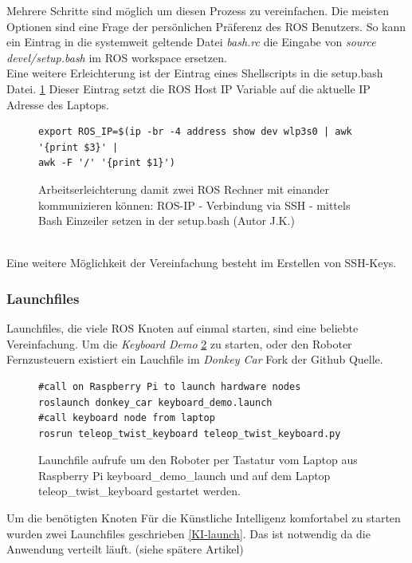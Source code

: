 \documentclass[conference]{IEEEtran}
\begin{document}
	Mehrere Schritte sind möglich um diesen Prozess zu vereinfachen. Die 
	meisten Optionen sind eine Frage der persönlichen Präferenz des ROS 
	Benutzers. So kann ein Eintrag in die systemweit geltende Datei 
	\textit{bash.rc} die Eingabe von \textit{source devel/setup.bash} im ROS 
	workspace ersetzen. \\
	Eine weitere Erleichterung ist der Eintrag eines Shellscripts in die 
	setup.bash Datei. \ref{Einzeiler} Dieser Eintrag setzt die ROS Host IP 
	Variable auf die aktuelle IP Adresse des Laptops.
	\begin{figure}
		\centering
\begin{verbatim}
export ROS_IP=$(ip -br -4 address show dev wlp3s0 | awk '{print $3}' | 
awk -F '/' '{print $1}')
\end{verbatim}
		\label{Einzeiler}
		\caption{Arbeitserleichterung damit zwei ROS Rechner mit einander 
		kommunizieren können: ROS-IP - Verbindung via SSH - mittels Bash 
		Einzeiler setzen  in der setup.bash (Autor J.K.)}
	\end{figure}
	\\
	Eine weitere Möglichkeit der Vereinfachung besteht im Erstellen von 
	SSH-Keys. 
	
	\subsubsection{Launchfiles}
	
	Launchfiles, die viele ROS Knoten auf einmal starten, sind eine beliebte 
	Vereinfachung. Um die \textit{Keyboard Demo} \ref{demo} zu starten, oder 
	den Roboter Fernzusteuern existiert ein Lauchfile im \textit{Donkey Car} 
	Fork der Github Quelle.
	\begin{figure}
		\centering
\begin{verbatim}
#call on Raspberry Pi to launch hardware nodes
roslaunch donkey_car keyboard_demo.launch
#call keyboard node from laptop 
rosrun teleop_twist_keyboard teleop_twist_keyboard.py
\end{verbatim}
\label{demo}
\caption{Launchfile aufrufe um den Roboter per Tastatur vom Laptop aus 
 Raspberry Pi keyboard\_demo\_launch und auf dem Laptop 
 teleop\_twist\_keyboard gestartet werden.}

	\end{figure}
	
	Um die benötigten Knoten Für die Künstliche Intelligenz komfortabel zu 
	starten wurden zwei Launchfiles geschrieben \ref{KI-launch}. Das ist 
	notwendig da die Anwendung verteilt läuft. (siehe spätere Artikel)
	
\end{document}
